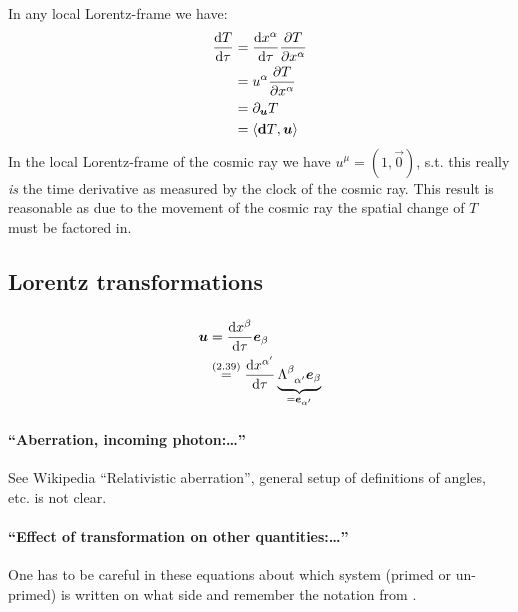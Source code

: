 \subsubsection{ }    \label{sususec:exe_2_6} 
In any local Lorentz-frame we have:
\begin{align*} 
	\derivative{T}{\tau}&=\derivative{x^\alpha}{\tau}\partialderivative{T}{x^\alpha}\\
	&=u^\alpha \partialderivative{T}{x^\alpha}\\
	&=\partial_{\boldsymbol{u}}T\\
	&=\apply{\boldsymbol{\dd}T}{\boldsymbol{u}}
\end{align*}
In the local Lorentz-frame of the cosmic ray we have $u^\mu=(1,\vec{0})$, s.t. this really \emph{is} the time derivative as measured by the clock of the cosmic ray.
This result is reasonable as due to the movement of the cosmic ray the spatial change of $T$ must be factored in.

\subsection{Lorentz transformations}\label{susec:2-9}
\subsubsection{ }
\begin{align*} 
	\boldsymbol{u}&=\derivative{x^\beta}{\tau}\boldsymbol{e}_\beta\\
	&\overset{\eqc{2.39}}{=}\derivative{x^{\alpha^\prime}}{\tau}\underbrace{\Lambda^{\beta}_{\phantom{\beta}\alpha^\prime}\boldsymbol{e}_\beta}_{=\boldsymbol{e}_{\alpha^\prime}}
\end{align*}
\subsubsection{ }
\paragraph{\enquote{Aberration, incoming photon:\dots}}
See Wikipedia \enquote{Relativistic aberration}, general setup of definitions of angles, etc. is not clear.\todo

\paragraph{\enquote{Effect of transformation on other quantities:\dots}}
One has to be careful in these equations about which system (primed or un-primed) is written on what side and remember the notation from .



